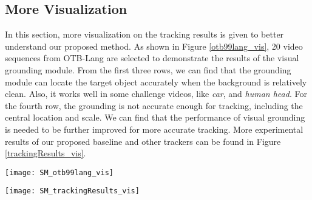 \documentclass[final]{cvpr}
\begin{document}
\subsection{More Visualization } 

In this section, more visualization on the tracking results is given to better understand our proposed method. As shown in Figure \ref{otb99lang_vis}, 20 video sequences from OTB-Lang are selected to demonstrate the results of the visual grounding module. From the first three rows, we can find that the grounding module can locate the target object accurately when the background is relatively clean. Also, it works well in some challenge videos, like \emph{car}, and \emph{human head}. For the fourth row, the grounding is not accurate enough for tracking, including the central location and scale. We can find that the performance of visual grounding is needed to be further improved for more accurate tracking. More experimental results of our proposed baseline and other trackers can be found in Figure \ref{trackingResults_vis}. 


\begin{figure*}[!htb]
\center
\texttt{[image: SM\_otb99lang\_vis]}
\caption{Results of the first frame of visual grounding module. }
\label{otb99lang_vis}
\end{figure*} 	


\begin{figure*}[!htb]
\center
\texttt{[image: SM\_trackingResults\_vis]}
\caption{Tracking results of our method and other state-of-the-art tracking algorithms. } 
\label{trackingResults_vis}
\end{figure*} 	



 



 
 
 
 
\end{document}

